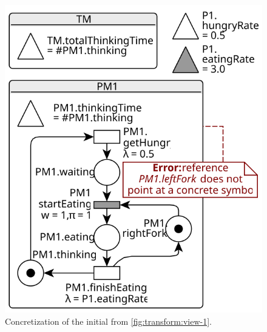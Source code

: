\begin{figure}%
  \begin{minipage}[t]{0.5\textwidth}
    \centering
    \includegraphics[scale=0.9]{figures/concrete_rgspn_example_initial}
    \caption{\protect\RaggedRight Concretization of the initial  from \vref{fig:transform:view-1}.}
    \label{fig:transform:concrete-1}
  \end{minipage}%
  \begin{minipage}[t]{0.5\textwidth}
    \centering

\end{minipage}
\end{figure}
